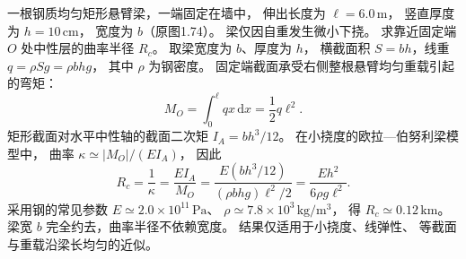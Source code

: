 一根钢质均匀矩形悬臂梁，一端固定在墙中，
伸出长度为 $\ell=6.0\,\mathrm m$，
竖直厚度为 $h=10\,\mathrm{cm}$，
宽度为 $b$（原图1.74）。
梁仅因自重发生微小下挠。
求靠近固定端 $O$ 处中性层的曲率半径 $R_c$。
\exsolution
取梁宽度为 $b$、厚度为 $h$，
横截面积 $S=bh$，线重
$q=\rho S g=\rho b h g$，
其中 $\rho$ 为钢密度。
固定端截面承受右侧整根悬臂均匀重载引起的弯矩：
\[
M_O=\int_0^\ell q x\,\mathrm dx
=\frac12q\ell^2.
\]
矩形截面对水平中性轴的截面二次矩
$I_A=bh^3/12$。
在小挠度的欧拉—伯努利梁模型中，
曲率 $\kappa\simeq|M_O|/(EI_A)$，
因此
\[
R_c=\frac1\kappa
=\frac{EI_A}{M_O}
=\frac{E(bh^3/12)}{(\rho bhg)\ell^2/2}
=\boxed{\frac{Eh^2}{6\rho g\ell^2}}.
\]
采用钢的常见参数
$E\simeq2.0\times10^{11}\,\mathrm{Pa}$、
$\rho\simeq7.8\times10^3\,\mathrm{kg/m^3}$，
得
$\boxed{R_c\simeq0.12\,\mathrm{km}}$。
\excheck 梁宽 $b$ 完全约去，曲率半径不依赖宽度。
结果仅适用于小挠度、线弹性、
等截面与重载沿梁长均匀的近似。
